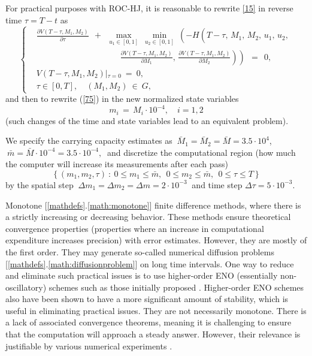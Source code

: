 \documentclass[11pt]{amsart}
\begin{document}
For practical purposes with ROC-HJ, it is reasonable to rewrite \cref{15} in reverse
time $ \tau = T - t $ as
\begin{equation}
\left\{ \begin{aligned}
& \frac{\partial V(T - \tau, M_1, M_2)}{\partial \tau} \:\: + \:\:
\max_{u_1 \in [0, 1]} \: \min_{u_2 \in [0, 1]} \:
\left( -H \left( T - \tau, \, M_1, \, M_2, \, u_1, \, u_2, 
{}^{{}^{{}^{{}^{{}^{}}}}} \right. \right. \\
& \qquad\qquad\qquad\qquad\qquad
\left. \left. \frac{\partial V(T - \tau, M_1, M_2)}{\partial M_1}, \,
\frac{\partial V(T - \tau, M_1, M_2)}{\partial M_2} \right) \right) \:\: =
\:\: 0, \\
& V(T - \tau, M_1, M_2) \left|_{\tau = 0} \right. \: = \: 0, \\
& \tau \in [0, T], \quad (M_1, M_2) \: \in \: G,
\end{aligned} \right.  \label{75}
\end{equation}
and then to rewrite (\ref{75}) in the new normalized state variables
\begin{equation}
m_i \, = \, M_i \cdot 10^{-4}, \quad i = 1,2  \label{75_1}
\end{equation}
(such changes of the time and state variables lead to an equivalent problem).


We specify the carrying capacity estimates as $ \: \bar{M}_1 = \bar{M}_2 =
\bar{M} = 3.5 \cdot 10^4 $,
$ \: \bar{m} = \bar{M} \cdot 10^{-4} = 3.5 \cdot 10^{-4}, \: $ and 
discretize the computational region (how much the computer will increase its measurements after each pass)
$$
\left\{ (m_1, m_2, \tau) \: \colon \: 0 \leqslant m_1 \leqslant \bar{m}, \:\: 0
\leqslant m_2 \leqslant \bar{m}, \:\:
0 \leqslant \tau \leqslant T \right\}
$$
by the spatial step $ \: \Delta m_1 = \Delta m_2 = \Delta m = 2 \cdot 10^{-3}
\: $ and time step $ \Delta \tau = 5 \cdot 10^{-3} $.

Monotone [\ref{mathdefs}.\ref{math:monotone}] finite difference methods, where there is a strictly increasing or decreasing behavior.
These methods ensure theoretical convergence properties (properties where an increase in computational expenditure increases precision) with error estimates. However, they are mostly of the first order. They may generate so-called 
numerical diffusion problems [\ref{mathdefs}.\ref{math:diffusionproblem}]
on long time intervals. One way to reduce and eliminate such practical issues is to use 
higher-order ENO (essentially non-oscillatory) schemes 
such as those initially proposed \cite{OsherShu1991}. Higher-order ENO schemes also have been shown to have a more significant amount of stability, which is useful in eliminating practical issues. They are not necessarily
monotone. There is a lack of associated convergence theorems, meaning it is challenging to ensure that the computation will approach a steady answer. However,
their relevance is justifiable by various numerical experiments 
\cite{OsherShu1991,BokanForcadelZidani2010}.
\end{document}
